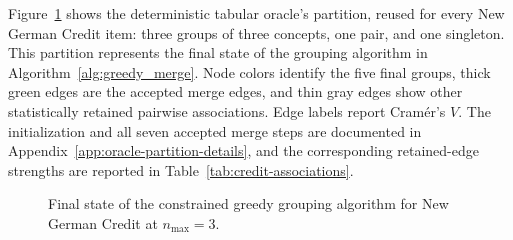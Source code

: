 Figure~\ref{fig:german-credit-grouping-final} shows the deterministic tabular oracle's partition, reused for every New German Credit item: three groups of three concepts, one pair, and one singleton. This partition represents the final state of the grouping algorithm in Algorithm~\ref{alg:greedy_merge}. Node colors identify the five final groups, thick green edges are the accepted merge edges, and thin gray edges show other statistically retained pairwise associations. Edge labels report Cram\'er's $V$. The initialization and all seven accepted merge steps are documented in Appendix~\ref{app:oracle-partition-details}, and the corresponding retained-edge strengths are reported in Table~\ref{tab:credit-associations}.

\begin{figure}[htb]
  \centering
  
  \caption{Final state of the constrained greedy grouping algorithm for New German Credit at $n_{\max}=3$.}
  \label{fig:german-credit-grouping-final}
\end{figure}
